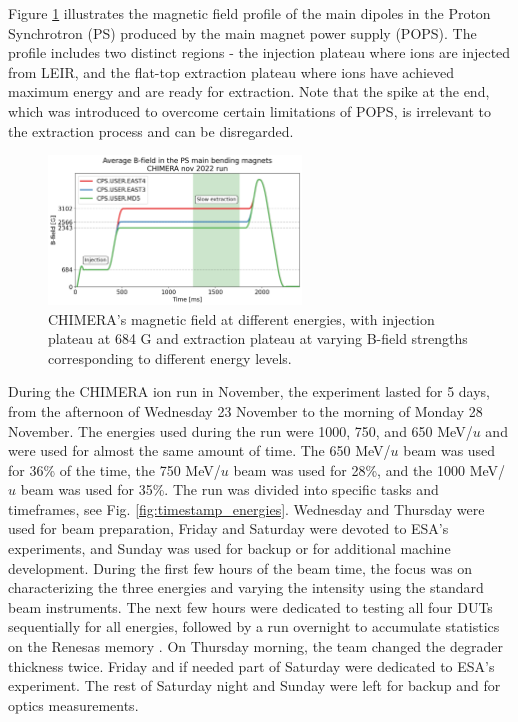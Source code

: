 \documentclass{cernatsnote}
\begin{document}
Figure \ref{fig:bfield} illustrates the magnetic field profile of the main dipoles in the Proton Synchrotron (PS) produced by the main magnet power supply (POPS). The profile includes two distinct regions - the injection plateau where ions are injected from LEIR, and the flat-top extraction plateau where ions have achieved maximum energy and are ready for extraction. Note that the spike at the end, which was introduced to overcome certain limitations of POPS, is irrelevant to the extraction process and can be disregarded.

\begin{figure}[!htb]
\centering
\includegraphics[width=0.6\textwidth]{images/PS_BEAM_ENERGY/average_b_field_chimera.png}
\caption{CHIMERA's magnetic field at different energies, with injection plateau at 684 G and extraction plateau at varying B-field strengths corresponding to different energy levels.}
\label{fig:bfield}
\end{figure}

During the CHIMERA ion run in November, the experiment lasted for 5 days, from the afternoon of Wednesday 23 November to the  morning of Monday 28 November. The energies used during the run were 1000, 750, and 650 MeV/$u$ and were used for almost the same amount of time. The 650 MeV/$u$ beam was used for 36\% of the time, the 750 MeV/$u$ beam was used for 28\%, and the 1000 MeV/$u$ beam was used for 35\%. The run was divided into specific tasks and timeframes, see Fig. \ref{fig:timestamp_energies}. Wednesday and Thursday were used for beam preparation, Friday and Saturday were devoted to ESA's experiments, and Sunday was used for backup or for additional machine development. During the first few hours of the beam time, the focus was on characterizing the three energies and varying the intensity using the standard beam instruments. The next few hours were dedicated to testing all four DUTs sequentially for all energies, followed by a run overnight to accumulate statistics on the Renesas memory \cite{noauthor_rmlv0816bgsa_nodate}. On Thursday morning, the team changed the degrader thickness twice. Friday and if needed part of Saturday were dedicated to ESA's experiment. The rest of Saturday night and Sunday were left for backup and for optics measurements.
\end{document}
